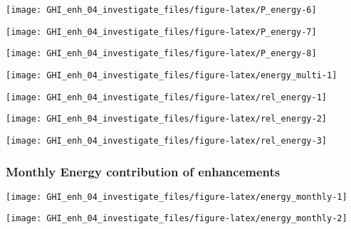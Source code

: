 \documentclass[
  10pt,
  a4paper,oneside]{article}
\begin{document}
\begin{center}\texttt{[image: GHI\_enh\_04\_investigate\_files/figure-latex/P\_energy-6]} \end{center}

\begin{center}\texttt{[image: GHI\_enh\_04\_investigate\_files/figure-latex/P\_energy-7]} \end{center}

\begin{center}\texttt{[image: GHI\_enh\_04\_investigate\_files/figure-latex/P\_energy-8]} \end{center}

\begin{center}\texttt{[image: GHI\_enh\_04\_investigate\_files/figure-latex/energy\_multi-1]} \end{center}

\begin{center}\texttt{[image: GHI\_enh\_04\_investigate\_files/figure-latex/rel\_energy-1]} \end{center}

\begin{center}\texttt{[image: GHI\_enh\_04\_investigate\_files/figure-latex/rel\_energy-2]} \end{center}

\begin{center}\texttt{[image: GHI\_enh\_04\_investigate\_files/figure-latex/rel\_energy-3]} \end{center}

\newpage
\FloatBarrier

\hypertarget{monthly-energy-contribution-of-enhancements}{%
\subsubsection{Monthly Energy contribution of enhancements}\label{monthly-energy-contribution-of-enhancements}}

\begin{center}\texttt{[image: GHI\_enh\_04\_investigate\_files/figure-latex/energy\_monthly-1]} \end{center}

\begin{center}\texttt{[image: GHI\_enh\_04\_investigate\_files/figure-latex/energy\_monthly-2]} \end{center}
\end{document}
